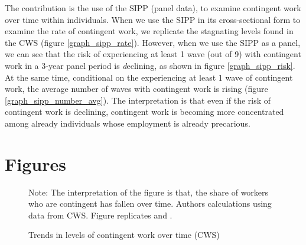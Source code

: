 \documentclass[12pt]{article}
\begin{document}
The contribution is the use of the SIPP (panel data), to examine contingent work over time within individuals.  When we use the SIPP in its cross-sectional form to examine the rate of contingent work, we replicate the stagnating levels found in the CWS (figure \ref{graph_sipp_rate}).  However, when we use the SIPP as a panel, we can see that the risk of experiencing at least 1 wave (out of 9) with contingent work in a 3-year panel period is {\emph declining}, as shown in figure \ref{graph_sipp_risk}.  At the same time, conditional on the experiencing at least 1 wave of contingent work, the average number of waves with contingent work is rising (figure \ref{graph_sipp_number_avg}).  The interpretation is that even if the risk of contingent work is declining, contingent work is becoming more concentrated among already individuals whose employment is already precarious.



\section{Figures}

\begin{figure}[htp!]
    \caption{Trends in levels of contingent work over time (CWS)}
    \label{graph_cps_rate}
    \footnotesize{Note: The interpretation of the figure is that, the share of workers who are contingent has fallen over time.  Authors calculations using data from CWS.  Figure replicates \citep[Fig. 5]{howell_kalleberg_2019} and  \cite[Fig 4-2]{abraham_houseman_2022}.}
\end{figure}
\end{document}
